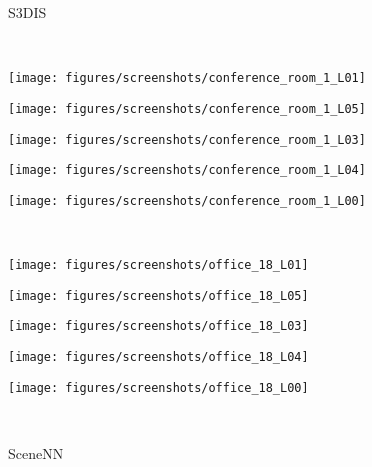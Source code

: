\documentclass[10pt,twocolumn,letterpaper]{article}
\begin{document}
\begin{figure*}[t!]
  \centering
  \begin{minipage}{\linewidth}
    S3DIS
  \end{minipage}\\
  \begin{minipage}{0.2\linewidth}
    \texttt{[image: figures/screenshots/conference\_room\_1\_L01]}
  \end{minipage}\begin{minipage}{0.2\linewidth}
    \texttt{[image: figures/screenshots/conference\_room\_1\_L05]}
  \end{minipage}\begin{minipage}{0.2\linewidth}
    \texttt{[image: figures/screenshots/conference\_room\_1\_L03]}
  \end{minipage}\begin{minipage}{0.2\linewidth}
    \texttt{[image: figures/screenshots/conference\_room\_1\_L04]}
  \end{minipage}\begin{minipage}{0.2\linewidth}
    \texttt{[image: figures/screenshots/conference\_room\_1\_L00]}
  \end{minipage}\\
  \begin{minipage}{0.2\linewidth}
    \texttt{[image: figures/screenshots/office\_18\_L01]}
  \end{minipage}\begin{minipage}{0.2\linewidth}
    \texttt{[image: figures/screenshots/office\_18\_L05]}
  \end{minipage}\begin{minipage}{0.2\linewidth}
    \texttt{[image: figures/screenshots/office\_18\_L03]}
  \end{minipage}\begin{minipage}{0.2\linewidth}
    \texttt{[image: figures/screenshots/office\_18\_L04]}
  \end{minipage}\begin{minipage}{0.2\linewidth}
    \texttt{[image: figures/screenshots/office\_18\_L00]}
  \end{minipage}\\
  \vspace{0.1in}
  \begin{minipage}{\linewidth}
    SceneNN
  \end{minipage}\\

\end{figure*}
\end{document}
